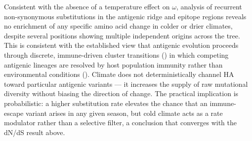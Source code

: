 \documentclass{pnas-new}
\begin{document}
Consistent with the absence of a temperature effect on $\omega$, analysis of recurrent non-synonymous substitutions in the antigenic ridge and epitope regions reveals no enrichment of any specific amino acid change in colder or drier climates, despite several positions showing multiple independent origins across the tree. This is consistent with the established view that antigenic evolution proceeds through discrete, immune-driven cluster transitions (\cite{smith_mapping_2004}) in which competing antigenic lineages are resolved by host population immunity rather than environmental conditions (\cite{strelkowa_clonal_2012}). Climate does not deterministically channel HA toward particular antigenic variants — it increases the supply of raw mutational diversity without biasing the direction of change. The practical implication is probabilistic: a higher substitution rate elevates the chance that an immune-escape variant arises in any given season, but cold climate acts as a rate modulator rather than a selective filter, a conclusion that converges with the dN/dS result above.
\end{document}
